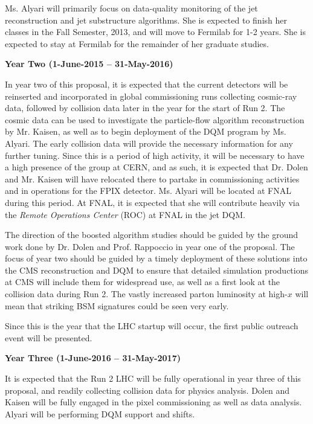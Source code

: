 \documentclass[12pt]{proposalnsf}
\begin{document}
Ms. Alyari will primarily focus on data-quality monitoring of the jet
reconstruction and jet substructure algorithms. She is expected to
finish her classes in the Fall Semester, 2013, and will move to
Fermilab for 1-2 years. She is expected to stay at Fermilab for the
remainder of her graduate studies. 



\bigskip
\bigskip
{\bf \Large Year Two (1-June-2015 -- 31-May-2016)}
\bigskip


In year two of this proposal, it is expected that the current
detectors will be reinserted and incorporated in global commissioning
runs collecting cosmic-ray data, followed by collision data later in the
year for the start of Run 2. The cosmic data can be used to investigate the
particle-flow algorithm reconstruction by Mr. Kaisen, as well as to
begin deployment of the DQM program by Ms. Alyari. The early collision
data will provide the necessary information for any further
tuning. Since this is a period of high activity, it
will be necessary to have a high presence of the group at CERN, and
as such, it is expected that Dr. Dolen and
Mr. Kaisen will have relocated there to partake in commissioning
activities and in operations for the FPIX detector. 
Ms. Alyari will be located at FNAL during this period. At FNAL, it is
expected that she will contribute heavily via the {\em Remote
  Operations Center} (ROC) at FNAL in the jet DQM.

The direction of the boosted algorithm studies should be guided by the
ground work done by Dr. Dolen and Prof. Rappoccio in year one of the proposal. 
The focus of year two should be guided by a timely deployment of these
solutions into the CMS reconstruction and DQM to ensure that
detailed simulation productions at CMS will include them for
widespread use, as well as a first look at the collision data during
Run 2. The vastly increased parton
luminosity at high-$x$ will mean that striking BSM signatures could be
seen very early. 

Since this is the year that the LHC startup will occur, 
the first public outreach event will be presented. 

\bigskip
\bigskip
{\bf \Large Year Three (1-June-2016 -- 31-May-2017)}
\bigskip


It is expected that the Run 2 LHC will be fully
operational in year three of this proposal, and readily collecting
collision data for physics analysis. Dolen and Kaisen will be fully
engaged in the pixel commissioning as well as data analysis. Alyari
will be performing DQM support and shifts.
\end{document}
